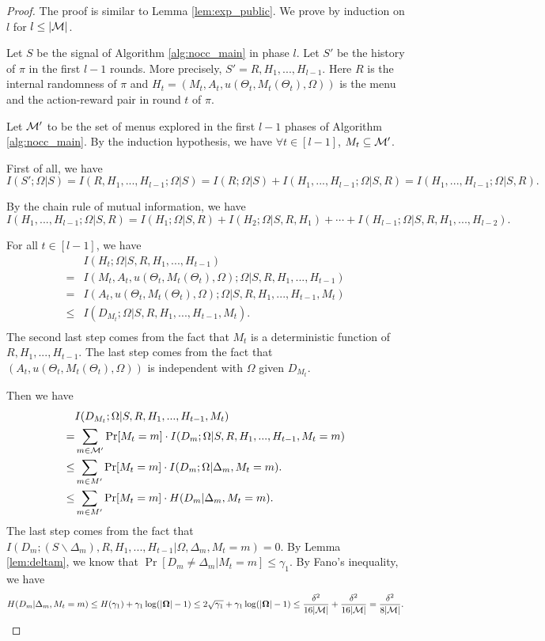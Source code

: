\begin{proof}
The proof is similar to Lemma \ref{lem:exp_public}. We prove by induction on $l$ for $l \leq |\mathcal{M}|$. 


Let $S$ be the signal of Algorithm \ref{alg:nocc_main} in phase $l$. Let $S'$ be the history of $\pi$ in the first $l-1$ rounds. More precisely, $S' = R, H_1,...,H_{l-1}$. Here $R$ is the internal randomness of $\pi$ and $H_t = (M_t, A_t,u(\Theta_t, M_t(\Theta_t), \Omega))$ is the menu and the action-reward pair in round $t$ of $\pi$. 

Let $\mathcal{M}'$ to be the set of menus explored in the first $l-1$ phases of Algorithm \ref{alg:nocc_main}. By the induction hypothesis, we have $\forall t\in[l-1]$, $M_t \subseteq \mathcal{M}'$. 

First of all, we have
\[
I(S'; \Omega| S) = I(R,H_1,...,H_{l-1}; \Omega| S)  = I(R; \Omega| S) + I(H_1,...,H_{l-1}; \Omega|S, R) = I(H_1,...,H_{l-1}; \Omega|S, R). 
\]

By the chain rule of mutual information, we have
\[
 I(H_1,...,H_{l-1}; \Omega|S, R) = I(H_1;\Omega|S,R) + I(H_2;\Omega|S, R ,H_1) + \cdots + I(H_{l-1}; \Omega|S,R,H_1,...,H_{l-2}). 
\]

For all $t \in [l-1]$, we have
\begin{align*}
&I(H_t; \Omega|S,R,H_1,...,H_{t-1}) \\
=& I(M_t,A_t, u(\Theta_t, M_t(\Theta_t), \Omega); \Omega|S,R,H_1,...,H_{t-1}) \\
=& I(A_t, u(\Theta_t, M_t(\Theta_t), \Omega); \Omega | S,R,H_1,...,H_{t-1}, M_t)\\
\leq& I(D_{M_t}; \Omega|S,R,H_1,...,H_{t-1},M_t). \\
\end{align*}
The second last step comes from the fact that $M_t$ is a deterministic function of $R,H_1,...,H_{t-1}$. The last step comes from the fact that $(A_t,u(\Theta_t, M_t(\Theta_t), \Omega))$ is independent with $\Omega$ given $D_{M_t}$.

Then we have
\begin{align*}
& I(D_{M_t}; \Omega|S,R,H_1,...,H_{t-1},M_t)\\
=& \sum_{m \in \mathcal{M}'} \Pr[M_t = m] \cdot I(D_m;\Omega | S,R,H_1,...,H_{t-1},M_t = m)\\
\leq& \sum_{m \in M'} \Pr[M_t = m] \cdot I(D_m;\Omega| \Delta_m, M_t =m).\\
\leq& \sum_{m \in M'} \Pr[M_t = m] \cdot H(D_m| \Delta_m, M_t =m).
\end{align*}
The last step comes from the fact that $I(D_m; (S\backslash \Delta_m),R,H_1,...,H_{t-1}|\Omega, \Delta_m, M_t =m) = 0$. By Lemma \ref{lem:deltam}, we know that $\Pr[D_m \neq \Delta_m|M_t = m] \leq \gamma_1$. By Fano's inequality, we have
\[
H(D_m| \Delta_m, M_t =m) \leq H(\gamma_1) + \gamma_1 \log(|\bold{\Omega}| - 1) \leq 2\sqrt{\gamma_1} + \gamma_1 \log(|\bold{\Omega}| - 1)\leq \frac{\delta^2}{16|\mathcal{M}|}+\frac{\delta^2}{16|\mathcal{M}|}  = \frac{\delta^2}{8|\mathcal{M}|}. 
\]


\end{proof}

